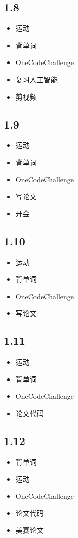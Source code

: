 \documentclass[UTF8]{ctexart}
\begin{document}
\subsection*{1.8}
\begin{itemize}
    \item 运动
    \item 背单词
    \item OneCodeChallenge
    \item 复习人工智能
    \item 剪视频
\end{itemize}

\subsection*{1.9}
\begin{itemize}
    \item 运动
    \item 背单词
    \item OneCodeChallenge
    \item 写论文
    \item 开会
\end{itemize}

\subsection*{1.10}
\begin{itemize}
    \item 运动
    \item 背单词
    \item OneCodeChallenge
    \item 写论文
\end{itemize}

\subsection*{1.11}
\begin{itemize}
    \item 运动
    \item 背单词
    \item OneCodeChallenge
    \item 论文代码
\end{itemize}

\subsection*{1.12}
\begin{itemize}
    \item 背单词
    \item 运动
    \item OneCodeChallenge
    \item 论文代码
    \item 美赛论文
\end{itemize}
\end{document}

